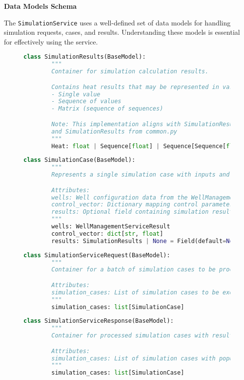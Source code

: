 \textbf{Data Models Schema}

The \texttt{SimulationService} uses a well-defined set of data models for handling simulation requests, cases, and results. Understanding these models is essential for effectively using the service.

\begin{figure}[H]
	\begin{lstlisting}[language=Python, caption={SimulationResults Model}]
		class SimulationResults(BaseModel):
		"""
		Container for simulation calculation results.

		Contains heat results that may be represented in various formats:
		- Single value
		- Sequence of values
		- Matrix (sequence of sequences)

		Note: This implementation aligns with SimulationResultType
		and SimulationResults from common.py
		"""
		Heat: float | Sequence[float] | Sequence[Sequence[float] | float]
	\end{lstlisting}
\end{figure}

\begin{figure}[H]
	\begin{lstlisting}[language=Python, caption={SimulationCase Model}]
		class SimulationCase(BaseModel):
		"""
		Represents a single simulation case with inputs and optional results.

		Attributes:
		wells: Well configuration data from the WellManagement service
		control_vector: Dictionary mapping control parameters to their values
		results: Optional field containing simulation results when completed
		"""
		wells: WellManagementServiceResult
		control_vector: dict[str, float]
		results: SimulationResults | None = Field(default=None)
	\end{lstlisting}
\end{figure}

\begin{figure}[H]
	\begin{lstlisting}[language=Python, caption={SimulationServiceRequest Model}]
		class SimulationServiceRequest(BaseModel):
		"""
		Container for a batch of simulation cases to be processed.

		Attributes:
		simulation_cases: List of simulation cases to be executed
		"""
		simulation_cases: list[SimulationCase]
	\end{lstlisting}
\end{figure}

\begin{figure}[h]
	\begin{lstlisting}[language=Python, caption={SimulationServiceResponse Model}]
		class SimulationServiceResponse(BaseModel):
		"""
		Container for processed simulation cases with results.

		Attributes:
		simulation_cases: List of simulation cases with populated results
		"""
		simulation_cases: list[SimulationCase]
	\end{lstlisting}
\end{figure}

